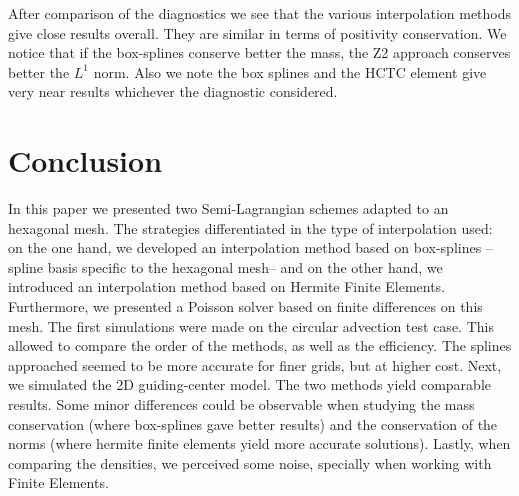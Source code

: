 \documentclass[proc]{edpsmath}
\begin{document}
After comparison of the diagnostics we see that the various interpolation methods give close results overall. They are similar in terms of positivity conservation. We notice that if the box-splines conserve better the mass, the Z2 approach conserves better the $L^1$ norm. Also we note the box splines and the HCTC element give very near results whichever the diagnostic considered.  


\section{Conclusion}
\label{sec:conclusion}
In this paper we presented two Semi-Lagrangian schemes adapted to an hexagonal mesh. The strategies differentiated in the type of interpolation used: on the one hand, we developed an interpolation method based on box-splines --spline basis specific to the hexagonal mesh-- and on the other hand, we introduced an interpolation method based on Hermite Finite Elements. Furthermore, we presented a Poisson solver based on finite differences on this mesh. The first simulations were made on the circular advection test case. This allowed to compare the order of the methods, as well as the efficiency. The splines approached seemed to be more accurate for finer grids, but at higher cost. Next, we simulated the 2D guiding-center model. The two methods yield comparable results. Some minor differences could be observable when studying the mass conservation (where box-splines gave better results) and the conservation of the norms (where hermite finite elements yield more accurate solutions). Lastly, when comparing the densities, we perceived some noise, specially when working with Finite Elements.




\end{document}
